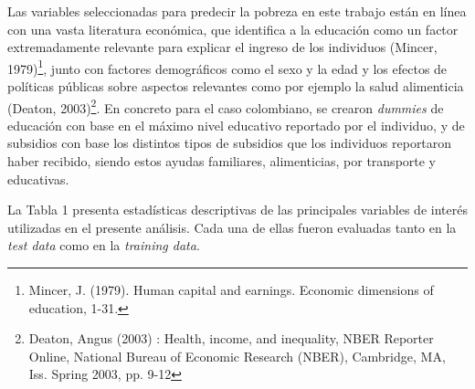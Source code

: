 \documentclass[11pt, a4paper]{article}
\begin{document}
Las variables seleccionadas para predecir la pobreza en este trabajo están en línea con una vasta literatura económica, que identifica a la educación como un factor extremadamente relevante para explicar el ingreso de los individuos (Mincer, 1979)\footnote{Mincer, J. (1979). Human capital and earnings. Economic dimensions of education, 1-31.}, junto con factores demográficos como el sexo y la edad y los efectos de políticas públicas sobre aspectos relevantes como por ejemplo la salud alimenticia (Deaton, 2003)\footnote{Deaton, Angus (2003) : Health, income, and inequality, NBER Reporter Online, National Bureau of Economic Research (NBER), Cambridge, MA, Iss. Spring 2003, pp. 9-12}. En concreto para el caso colombiano, se crearon \textit{dummies} de educación con base en el máximo nivel educativo reportado por el individuo, y de subsidios con base los distintos tipos de subsidios que los individuos reportaron haber recibido, siendo estos ayudas familiares, alimenticias, por transporte y educativas. 

La Tabla 1 presenta estadísticas descriptivas de las principales variables de interés utilizadas en el presente análisis. Cada una de ellas fueron evaluadas tanto en  la \textit{test data} como en la  \textit{training data}. 
\end{document}
